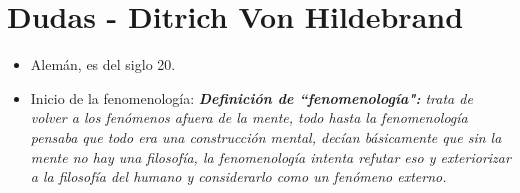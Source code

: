 \section{Dudas - Ditrich Von Hildebrand} 
\begin{itemize}
    \item Alemán, es del siglo 20.
    \item Inicio de la fenomenología: \emph{\textbf{Definición de ``fenomenología":} trata de volver a los fenómenos afuera de la mente, todo hasta la fenomenología pensaba que todo era una construcción mental, decían básicamente que sin la mente no hay una filosofía, la fenomenología intenta refutar eso y exteriorizar a la filosofía del humano y considerarlo como un fenómeno externo.}
\end{itemize}


